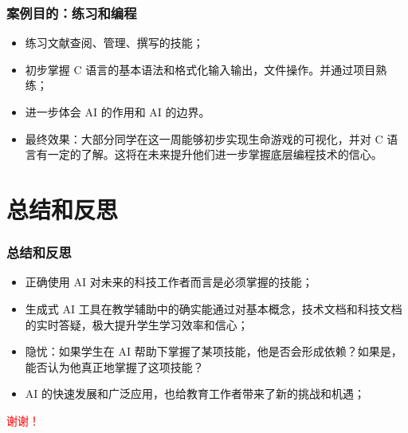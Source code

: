 \documentclass{beamer}
\begin{document}
\begin{frame}
    \frametitle{案例目的：练习和编程}
    \begin{itemize}
        \item 练习文献查阅、管理、撰写的技能；
        \item 初步掌握 C 语言的基本语法和格式化输入输出，文件操作。并通过项目熟练；
        \item 进一步体会 AI 的作用和 AI 的边界。
        \item 最终效果：大部分同学在这一周能够初步实现生命游戏的可视化，并对 C 语言有一定的了解。这将在未来提升他们进一步掌握底层编程技术的信心。
    \end{itemize}    
\end{frame}

\section{总结和反思}

\begin{frame}
    \frametitle{总结和反思}
    \begin{itemize}
        \item<1-> 正确使用 AI 对未来的科技工作者而言是必须掌握的技能；
        \item<1-> 生成式 AI 工具在教学辅助中的确实能通过对基本概念，技术文档和科技文档的实时答疑，极大提升学生学习效率和信心；
        \item<2-> 隐忧：如果学生在 AI 帮助下掌握了某项技能，他是否会形成依赖？如果是，能否认为他真正地掌握了这项技能？
        \item<3-> AI 的快速发展和广泛应用，也给教育工作者带来了新的挑战和机遇；
    \end{itemize}
\end{frame}

\begin{frame}
    \begin{center}
        \Huge \textcolor{red}{谢谢！}
    \end{center}
\end{frame}
\end{document}
